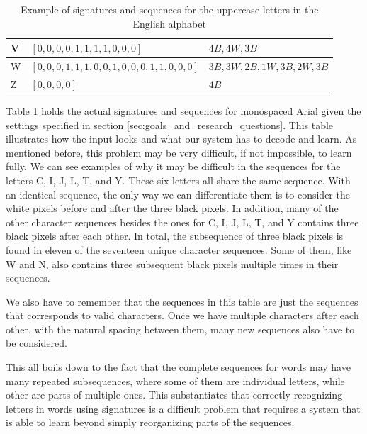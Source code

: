 \begin{table}[H]
\begin{tabular}{|l|l|l|}
        V                     & \([0, 0, 0, 0, 1, 1, 1, 1, 0, 0, 0]\)                   & \(4B, 4W, 3B\)                 \\ \hline
        W                     & \([0, 0, 0, 1, 1, 1, 0, 0, 1, 0, 0, 0, 1, 1, 0, 0, 0]\) & \(3B, 3W, 2B, 1W, 3B, 2W, 3B\) \\ \hline
        Z                     & \([0, 0, 0, 0]\)                                        & \(4B\)                         \\ \hline
    \end{tabular}
    \caption{Example of signatures and sequences for the uppercase letters in the English alphabet}
    \label{table:signature_sequence_example}
\end{table}

Table \ref{table:signature_sequence_example} holds the actual signatures and sequences for monospaced Arial given the settings specified in section \ref{sec:goals_and_research_questions}. This table illustrates how the input looks and what our system has to decode and learn. As mentioned before, this problem may be very difficult, if not impossible, to learn fully. We can see examples of why it may be difficult in the sequences for the letters C, I, J, L, T, and Y. These six letters all share the same sequence. With an identical sequence, the only way we can differentiate them is to consider the white pixels before and after the three black pixels.  In addition, many of the other character sequences besides the ones for C, I, J, L, T, and Y contains three black pixels after each other. In total, the subsequence of three black pixels is found in eleven of the seventeen unique character sequences. Some of them, like W and N, also contains three subsequent black pixels multiple times in their sequences. 

We also have to remember that the sequences in this table are just the sequences that corresponds to valid characters. Once we have multiple characters after each other, with the natural spacing between them, many new sequences also have to be considered. 

This all boils down to the fact that the complete sequences for words may have many repeated subsequences, where some of them are individual letters, while other are parts of multiple ones. This substantiates that correctly recognizing letters in words using signatures is a difficult problem that requires a system that is able to learn beyond simply reorganizing parts of the sequences.


